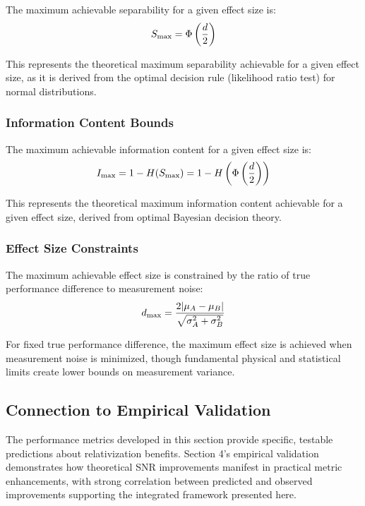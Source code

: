 The maximum achievable separability for a given effect size is:
\begin{equation}
S_{\max} = \Phi\left(\frac{d}{2}\right)
\end{equation}

This represents the theoretical maximum separability achievable for a given effect size, as it is derived from the optimal decision rule (likelihood ratio test) for normal distributions.

\subsubsection{Information Content Bounds}

The maximum achievable information content for a given effect size is:
\begin{equation}
I_{\max} = 1 - H(S_{\max}) = 1 - H\left(\Phi\left(\frac{d}{2}\right)\right)
\end{equation}

This represents the theoretical maximum information content achievable for a given effect size, derived from optimal Bayesian decision theory.

\subsubsection{Effect Size Constraints}

The maximum achievable effect size is constrained by the ratio of true performance difference to measurement noise:
\begin{equation}
d_{\max} = \frac{2|\mu_A - \mu_B|}{\sqrt{\sigma_A^2 + \sigma_B^2}}
\end{equation}

For fixed true performance difference, the maximum effect size is achieved when measurement noise is minimized, though fundamental physical and statistical limits create lower bounds on measurement variance.

\subsection{Connection to Empirical Validation}

The performance metrics developed in this section provide specific, testable predictions about relativization benefits. Section 4's empirical validation demonstrates how theoretical SNR improvements manifest in practical metric enhancements, with strong correlation between predicted and observed improvements supporting the integrated framework presented here.

